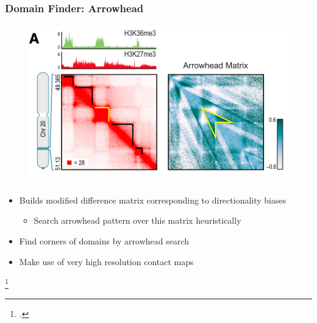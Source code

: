 \documentclass[12pt]{beamer}
\begin{document}
\begin{frame}
\frametitle{Domain Finder: Arrowhead}

\begin{figure}
\includegraphics[scale=0.75]{arrowheadmatrix.png}
\end{figure}

\begin{itemize}
\item Builds modified difference matrix corresponding to
  directionality biases
\begin{itemize}
\item Search arrowhead pattern over this matrix heuristically
\end{itemize}
\vspace{0.1cm}
\item Find corners of domains by arrowhead search
\vspace{0.1cm}
\item Make use of very high resolution contact maps
\end{itemize}

\footcitetext{rao2014}

\end{frame}
\end{document}
